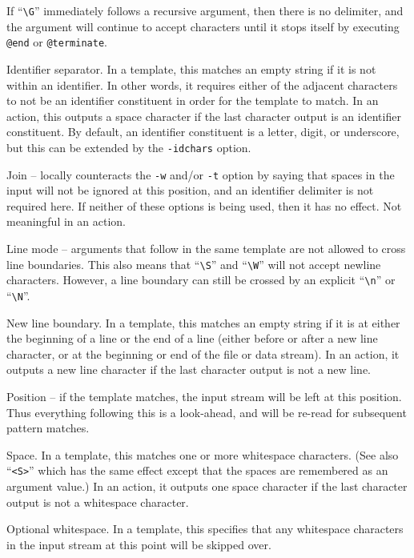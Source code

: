 \begin{description}
If ``\verb/\G/'' immediately follows a recursive argument, then there is no
delimiter, and the argument will continue to accept characters until it
stops itself by executing \verb/@end/ or \verb/@terminate/.
\item[{\tt $\backslash$I}]
Identifier separator.  In a template, this matches an empty string if it
is not within an identifier.  In other words, it requires either of the
adjacent characters to not be an identifier constituent in order for the
template to match.
In an action, this outputs a space character if the last character
output is an identifier constituent.
By default, an identifier constituent is a letter, digit, or underscore,
but this can be extended by the \verb/-idchars/ option.
\item[{\tt $\backslash$J}]
Join -- locally counteracts the \verb/-w/ and/or \verb/-t/
option by saying that spaces in the input will not be ignored at this
position, and an identifier delimiter is not required here.
If neither of these options is being used, then it has no effect.
Not meaningful in an action.
\item[{\tt $\backslash$L}]
Line mode -- arguments that follow in the same template are not allowed
to cross line boundaries.
This also means that ``\verb/\S/'' and ``\verb/\W/'' will not accept
newline characters.  However, a line boundary can still be crossed by an
explicit ``\verb/\n/'' or ``\verb/\N/''.
\item[{\tt $\backslash$N}]
New line boundary.
In a template, this matches an empty string if it is at either the
beginning of a line or the end of a line (either before or after a new
line character, or at the beginning or end of the file or data stream).
In an action, it outputs a new line character if the last character
output is not a new line.
\item[{\tt $\backslash$P}]
Position -- if the template matches, the input stream will be left at
this position.  Thus everything following this is a look-ahead, and will
be re-read for subsequent pattern matches.
\item[{\tt $\backslash$S}]
Space.  In a template, this matches one or more whitespace characters.
(See also ``\verb/<S>/'' which has the same effect except that the
spaces are remembered as an argument value.)
In an action, it outputs one space character if the last character
output is not a whitespace character.
\item[{\tt $\backslash$W}]
Optional whitespace.  In a template, this specifies that any whitespace
characters in the input stream at this point will be skipped over.

\end{description}

